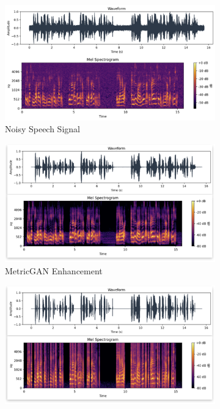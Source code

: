 \begin{figure}[H]
    \centering
         \begin{subfigure}[b]{0.3\textwidth}
             \centering
             \includegraphics[width=\textwidth]{figures/snr10_o.png}
             \caption{Noisy Speech Signal}
             \label{fig:y equals x}
         \end{subfigure}
         \hfill
         \begin{subfigure}[b]{0.3\textwidth}
             \centering
             \includegraphics[width=\textwidth]{figures/snr10_e.png}
             \caption{MetricGAN Enhancement}
             \label{fig:three sin x}
         \end{subfigure}
         \hfill
         \begin{subfigure}[b]{0.3\textwidth}
             \centering
             \includegraphics[width=\textwidth]{figures/snr10_w.png}

\end{subfigure}
\end{figure}
